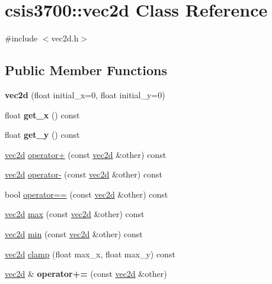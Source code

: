 \hypertarget{classcsis3700_1_1vec2d}{}\section{csis3700\+:\+:vec2d Class Reference}
\label{classcsis3700_1_1vec2d}


{\ttfamily \#include $<$vec2d.\+h$>$}

\subsection*{Public Member Functions}
\begin{DoxyCompactItemize}
\item 
\mbox{\label{classcsis3700_1_1vec2d_a40ee61b39f4e735dc12bd6030036c276}} 
{\bfseries vec2d} (float initial\+\_\+x=0, float initial\+\_\+y=0)
\item 
\mbox{\label{classcsis3700_1_1vec2d_abbc06aa198f2a0c974259e3e08a7bc09}} 
float {\bfseries get\+\_\+x} () const
\item 
\mbox{\label{classcsis3700_1_1vec2d_aa9d00524399eccfa186fb19b5cf9e635}} 
float {\bfseries get\+\_\+y} () const
\item 
\hyperlink{classcsis3700_1_1vec2d}{vec2d} \hyperlink{classcsis3700_1_1vec2d_af0b6fa5ce2a480ad9d0c4ab1fbbe4d1b}{operator+} (const \hyperlink{classcsis3700_1_1vec2d}{vec2d} \&other) const
\item 
\hyperlink{classcsis3700_1_1vec2d}{vec2d} \hyperlink{classcsis3700_1_1vec2d_a423878a90a2ea8ac8174f4b8d9b2721e}{operator-\/} (const \hyperlink{classcsis3700_1_1vec2d}{vec2d} \&other) const
\item 
bool \hyperlink{classcsis3700_1_1vec2d_a03dc593f880647772abb9b0abc865cbe}{operator==} (const \hyperlink{classcsis3700_1_1vec2d}{vec2d} \&other) const
\item 
\hyperlink{classcsis3700_1_1vec2d}{vec2d} \hyperlink{classcsis3700_1_1vec2d_ac311938a3cf00e5cd919e27493337ed1}{max} (const \hyperlink{classcsis3700_1_1vec2d}{vec2d} \&other) const
\item 
\hyperlink{classcsis3700_1_1vec2d}{vec2d} \hyperlink{classcsis3700_1_1vec2d_a6368f4e6d0d7031278b540a5dda5bb91}{min} (const \hyperlink{classcsis3700_1_1vec2d}{vec2d} \&other) const
\item 
\hyperlink{classcsis3700_1_1vec2d}{vec2d} \hyperlink{classcsis3700_1_1vec2d_a73b3a12f9c2ebddb35d6cda11e167964}{clamp} (float max\+\_\+x, float max\+\_\+y) const
\item 
\mbox{\label{classcsis3700_1_1vec2d_a2dc8b8021ffeed353db058f4815c8c24}} 
\hyperlink{classcsis3700_1_1vec2d}{vec2d} \& {\bfseries operator+=} (const \hyperlink{classcsis3700_1_1vec2d}{vec2d} \&other)
\end{DoxyCompactItemize}


